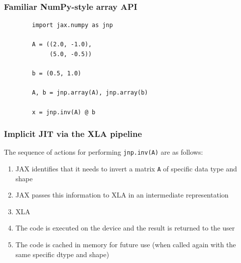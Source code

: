 \begin{frame}[fragile]
    \frametitle{Familiar NumPy-style array API}

    \begin{verbatim}
        import jax.numpy as jnp

        A = ((2.0, -1.0),
             (5.0, -0.5))

        b = (0.5, 1.0)

        A, b = jnp.array(A), jnp.array(b)

        x = jnp.inv(A) @ b
    \end{verbatim}

\end{frame}


\begin{frame}[fragile]
    \frametitle{Implicit JIT via the XLA pipeline}

    The sequence of actions for performing \texttt{jnp.inv(A)} are as follows:

    \begin{enumerate}
        \item JAX identifies that it needs to invert a matrix \texttt{A} of
            specific data type and shape
        \vspace{0.5em}
        \item JAX passes this information to XLA in an intermediate
            representation
        \vspace{0.5em}
        \item XLA 
        \vspace{0.5em}
        \item The code is executed on the device and the result is returned to
            the user
        \vspace{0.5em}
        \item The code is cached in memory for future use (when called again
            with the same specific dtype and shape)
    \end{enumerate}

\end{frame}


